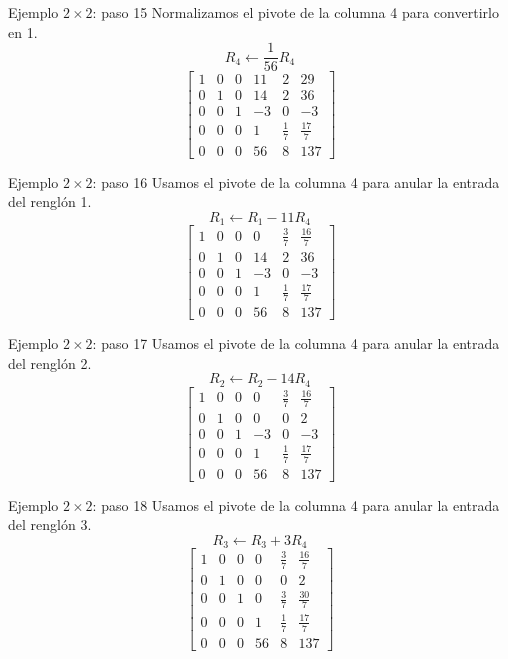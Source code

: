 \documentclass[aspectratio=169,9pt]{beamer}
\theoremstyle{remark}
\begin{document}
\begin{frame}[t]{Ejemplo $2\times2$: paso 15}
Normalizamos el pivote de la columna 4 para convertirlo en 1.
\[
R_{4}\leftarrow \frac{1}{56}R_{4}
\]
\[
\left[\begin{array}{ccccc|c}
1 & 0 & 0 & 11 & 2 & 29\\
0 & 1 & 0 & 14 & 2 & 36\\
0 & 0 & 1 & -3 & 0 & -3\\
0 & 0 & 0 & 1 & \frac{1}{7} & \frac{17}{7}\\
0 & 0 & 0 & 56 & 8 & 137
\end{array}\right]
\]
\end{frame}
\begin{frame}[t]{Ejemplo $2\times2$: paso 16}
Usamos el pivote de la columna 4 para anular la entrada del renglón 1.
\[
R_{1}\leftarrow R_{1}-11R_{4}
\]
\[
\left[\begin{array}{ccccc|c}
1 & 0 & 0 & 0 & \frac{3}{7} & \frac{16}{7}\\
0 & 1 & 0 & 14 & 2 & 36\\
0 & 0 & 1 & -3 & 0 & -3\\
0 & 0 & 0 & 1 & \frac{1}{7} & \frac{17}{7}\\
0 & 0 & 0 & 56 & 8 & 137
\end{array}\right]
\]
\end{frame}
\begin{frame}[t]{Ejemplo $2\times2$: paso 17}
Usamos el pivote de la columna 4 para anular la entrada del renglón 2.
\[
R_{2}\leftarrow R_{2}-14R_{4}
\]
\[
\left[\begin{array}{ccccc|c}
1 & 0 & 0 & 0 & \frac{3}{7} & \frac{16}{7}\\
0 & 1 & 0 & 0 & 0 & 2\\
0 & 0 & 1 & -3 & 0 & -3\\
0 & 0 & 0 & 1 & \frac{1}{7} & \frac{17}{7}\\
0 & 0 & 0 & 56 & 8 & 137
\end{array}\right]
\]
\end{frame}
\begin{frame}[t]{Ejemplo $2\times2$: paso 18}
Usamos el pivote de la columna 4 para anular la entrada del renglón 3.
\[
R_{3}\leftarrow R_{3}+3R_{4}
\]
\[
\left[\begin{array}{ccccc|c}
1 & 0 & 0 & 0 & \frac{3}{7} & \frac{16}{7}\\
0 & 1 & 0 & 0 & 0 & 2\\
0 & 0 & 1 & 0 & \frac{3}{7} & \frac{30}{7}\\
0 & 0 & 0 & 1 & \frac{1}{7} & \frac{17}{7}\\
0 & 0 & 0 & 56 & 8 & 137
\end{array}\right]
\]
\end{frame}
\end{document}
